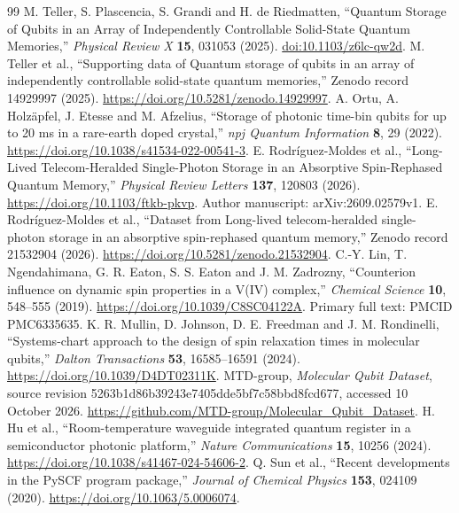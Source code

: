 \documentclass[11pt,a4paper]{article}
\begin{document}
\clearpage
{\footnotesize
\begin{thebibliography}{99}
\setlength{\itemsep}{1pt}
\setlength{\parsep}{0pt}
 M. Teller, S. Plascencia, S. Grandi and H. de Riedmatten, ``Quantum Storage of Qubits in an Array of Independently Controllable Solid-State Quantum Memories,'' \emph{Physical Review X} \textbf{15}, 031053 (2025). \href{https://doi.org/10.1103/z6lc-qw2d}{doi:10.1103/z6lc-qw2d}.
 M. Teller et al., ``Supporting data of Quantum storage of qubits in an array of independently controllable solid-state quantum memories,'' Zenodo record 14929997 (2025). \url{https://doi.org/10.5281/zenodo.14929997}.
 A. Ortu, A. Holz\"apfel, J. Etesse and M. Afzelius, ``Storage of photonic time-bin qubits for up to 20 ms in a rare-earth doped crystal,'' \emph{npj Quantum Information} \textbf{8}, 29 (2022). \url{https://doi.org/10.1038/s41534-022-00541-3}.
 E. Rodr\'iguez-Moldes et al., ``Long-Lived Telecom-Heralded Single-Photon Storage in an Absorptive Spin-Rephased Quantum Memory,'' \emph{Physical Review Letters} \textbf{137}, 120803 (2026). \url{https://doi.org/10.1103/ftkb-pkvp}. Author manuscript: arXiv:2609.02579v1.
 E. Rodr\'iguez-Moldes et al., ``Dataset from Long-lived telecom-heralded single-photon storage in an absorptive spin-rephased quantum memory,'' Zenodo record 21532904 (2026). \url{https://doi.org/10.5281/zenodo.21532904}.
 C.-Y. Lin, T. Ngendahimana, G. R. Eaton, S. S. Eaton and J. M. Zadrozny, ``Counterion influence on dynamic spin properties in a V(IV) complex,'' \emph{Chemical Science} \textbf{10}, 548--555 (2019). \url{https://doi.org/10.1039/C8SC04122A}. Primary full text: PMCID PMC6335635.
 K. R. Mullin, D. Johnson, D. E. Freedman and J. M. Rondinelli, ``Systems-chart approach to the design of spin relaxation times in molecular qubits,'' \emph{Dalton Transactions} \textbf{53}, 16585--16591 (2024). \url{https://doi.org/10.1039/D4DT02311K}.
 MTD-group, \emph{Molecular Qubit Dataset}, source revision 5263b1d86b39243e7405dde5bf7c58bbd8fcd677, accessed 10 October 2026. \url{https://github.com/MTD-group/Molecular_Qubit_Dataset}.
 H. Hu et al., ``Room-temperature waveguide integrated quantum register in a semiconductor photonic platform,'' \emph{Nature Communications} \textbf{15}, 10256 (2024). \url{https://doi.org/10.1038/s41467-024-54606-2}.
 Q. Sun et al., ``Recent developments in the PySCF program package,'' \emph{Journal of Chemical Physics} \textbf{153}, 024109 (2020). \url{https://doi.org/10.1063/5.0006074}.

\end{thebibliography}}
\end{document}
